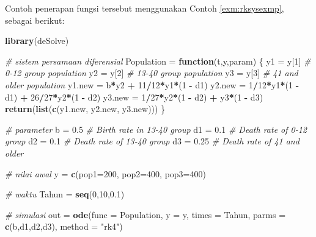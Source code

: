 \documentclass[
]{book}
\newenvironment{Shaded}{\begin{snugshade}}{\end{snugshade}}
\newcommand{\AttributeTok}[1]{\textcolor[rgb]{0.13,0.29,0.53}{#1}}
\newcommand{\CommentTok}[1]{\textcolor[rgb]{0.56,0.35,0.01}{\textit{#1}}}
\newcommand{\ControlFlowTok}[1]{\textcolor[rgb]{0.13,0.29,0.53}{\textbf{#1}}}
\newcommand{\DecValTok}[1]{\textcolor[rgb]{0.00,0.00,0.81}{#1}}
\newcommand{\FloatTok}[1]{\textcolor[rgb]{0.00,0.00,0.81}{#1}}
\newcommand{\FunctionTok}[1]{\textcolor[rgb]{0.13,0.29,0.53}{\textbf{#1}}}
\newcommand{\NormalTok}[1]{#1}
\newcommand{\OtherTok}[1]{\textcolor[rgb]{0.56,0.35,0.01}{#1}}
\newcommand{\SpecialCharTok}[1]{\textcolor[rgb]{0.81,0.36,0.00}{\textbf{#1}}}
\newcommand{\StringTok}[1]{\textcolor[rgb]{0.31,0.60,0.02}{#1}}
\theoremstyle{definition}
\theoremstyle{definition}
\theoremstyle{definition}
\theoremstyle{definition}
\theoremstyle{remark}
\begin{document}
Contoh penerapan fungsi tersebut menggunakan Contoh \ref{exm:rksysexmp}, sebagai berikut:

\begin{Shaded}
\begin{Highlighting}[]
\FunctionTok{library}\NormalTok{(deSolve)}

\CommentTok{\# sistem persamaan diferensial}
\NormalTok{Population }\OtherTok{=} \ControlFlowTok{function}\NormalTok{(t,y,param) \{}
\NormalTok{  y1 }\OtherTok{=}\NormalTok{ y[}\DecValTok{1}\NormalTok{] }\CommentTok{\# 0{-}12 group population}
\NormalTok{  y2 }\OtherTok{=}\NormalTok{ y[}\DecValTok{2}\NormalTok{] }\CommentTok{\# 13{-}40 group population}
\NormalTok{  y3 }\OtherTok{=}\NormalTok{ y[}\DecValTok{3}\NormalTok{] }\CommentTok{\# 41 and older population}
\NormalTok{  y1.new }\OtherTok{=}\NormalTok{ b}\SpecialCharTok{*}\NormalTok{y2 }\SpecialCharTok{+} \DecValTok{11}\SpecialCharTok{/}\DecValTok{12}\SpecialCharTok{*}\NormalTok{y1}\SpecialCharTok{*}\NormalTok{(}\DecValTok{1} \SpecialCharTok{{-}}\NormalTok{ d1)}
\NormalTok{  y2.new }\OtherTok{=} \DecValTok{1}\SpecialCharTok{/}\DecValTok{12}\SpecialCharTok{*}\NormalTok{y1}\SpecialCharTok{*}\NormalTok{(}\DecValTok{1} \SpecialCharTok{{-}}\NormalTok{ d1) }\SpecialCharTok{+} \DecValTok{26}\SpecialCharTok{/}\DecValTok{27}\SpecialCharTok{*}\NormalTok{y2}\SpecialCharTok{*}\NormalTok{(}\DecValTok{1} \SpecialCharTok{{-}}\NormalTok{ d2)}
\NormalTok{  y3.new }\OtherTok{=} \DecValTok{1}\SpecialCharTok{/}\DecValTok{27}\SpecialCharTok{*}\NormalTok{y2}\SpecialCharTok{*}\NormalTok{(}\DecValTok{1} \SpecialCharTok{{-}}\NormalTok{ d2) }\SpecialCharTok{+}\NormalTok{ y3}\SpecialCharTok{*}\NormalTok{(}\DecValTok{1} \SpecialCharTok{{-}}\NormalTok{ d3)}
  \FunctionTok{return}\NormalTok{(}\FunctionTok{list}\NormalTok{(}\FunctionTok{c}\NormalTok{(y1.new, y2.new, y3.new)))}
\NormalTok{\}}

\CommentTok{\# parameter}
\NormalTok{b }\OtherTok{=} \FloatTok{0.5} \CommentTok{\# Birth rate in 13{-}40 group}
\NormalTok{d1 }\OtherTok{=} \FloatTok{0.1} \CommentTok{\# Death rate of 0{-}12 group}
\NormalTok{d2 }\OtherTok{=} \FloatTok{0.1} \CommentTok{\# Death rate of 13{-}40 group}
\NormalTok{d3 }\OtherTok{=} \FloatTok{0.25} \CommentTok{\# Death rate of 41 and older}

\CommentTok{\# nilai awal}
\NormalTok{y }\OtherTok{=} \FunctionTok{c}\NormalTok{(}\AttributeTok{pop1=}\DecValTok{200}\NormalTok{, }\AttributeTok{pop2=}\DecValTok{400}\NormalTok{, }\AttributeTok{pop3=}\DecValTok{400}\NormalTok{)}

\CommentTok{\# waktu}
\NormalTok{Tahun }\OtherTok{=} \FunctionTok{seq}\NormalTok{(}\DecValTok{0}\NormalTok{,}\DecValTok{10}\NormalTok{,}\FloatTok{0.1}\NormalTok{)}

\CommentTok{\# simulasi}
\NormalTok{out }\OtherTok{=} \FunctionTok{ode}\NormalTok{(}\AttributeTok{func =}\NormalTok{ Population, }\AttributeTok{y =}\NormalTok{ y, }\AttributeTok{times =}\NormalTok{ Tahun, }
          \AttributeTok{parms =} \FunctionTok{c}\NormalTok{(b,d1,d2,d3), }\AttributeTok{method =} \StringTok{"rk4"}\NormalTok{)}
\end{Highlighting}
\end{Shaded}
\end{document}
